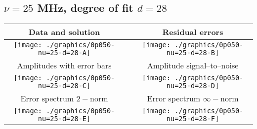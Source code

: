 

% 

\clearpage{}
\break{}

\subsection{$\nu = 25$ MHz, degree of fit $d = 28$}

\begin{table}[h]
    \begin{center}
        \begin{tabular}{ccc}
            Data and solution & \quad & Residual errors \\\hline
            \texttt{[image: ./graphics/0p050-nu=25-d=28-A]} &&
            \texttt{[image: ./graphics/0p050-nu=25-d=28-B]} \\[15pt]
            Amplitudes with error bars && Amplitude signal--to--noise \\\hline
            \texttt{[image: ./graphics/0p050-nu=25-d=28-C]} &&
            \texttt{[image: ./graphics/0p050-nu=25-d=28-D]} \\[15pt]
            Error spectrum $2-$norm && Error spectrum $\infty-$norm \\\hline
            \texttt{[image: ./graphics/0p050-nu=25-d=28-E]} &&
            \texttt{[image: ./graphics/0p050-nu=25-d=28-F]} \\[15pt]
        \end{tabular}
    \end{center}
\label{fig:elev=50, nu=25}
\end{table}



\endinput
